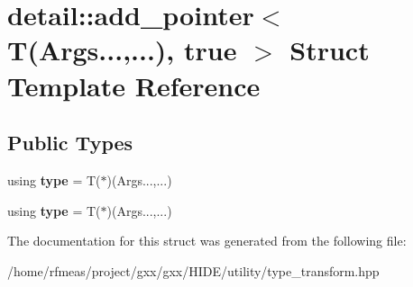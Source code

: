 \hypertarget{structdetail_1_1add__pointer_3_01T_07Args_8_8_8_00_8_8_8_08_00_01true_01_4}{}\section{detail\+:\+:add\+\_\+pointer$<$ T(Args...,...), true $>$ Struct Template Reference}
\label{structdetail_1_1add__pointer_3_01T_07Args_8_8_8_00_8_8_8_08_00_01true_01_4}
\subsection*{Public Types}
\begin{DoxyCompactItemize}
\item 
using {\bfseries type} = T($\ast$)(Args...,...)\hypertarget{structdetail_1_1add__pointer_3_01T_07Args_8_8_8_00_8_8_8_08_00_01true_01_4_a11c2462d35d30168f790a99cbe1d0abf}{}\label{structdetail_1_1add__pointer_3_01T_07Args_8_8_8_00_8_8_8_08_00_01true_01_4_a11c2462d35d30168f790a99cbe1d0abf}

\item 
using {\bfseries type} = T($\ast$)(Args...,...)\hypertarget{structdetail_1_1add__pointer_3_01T_07Args_8_8_8_00_8_8_8_08_00_01true_01_4_a11c2462d35d30168f790a99cbe1d0abf}{}\label{structdetail_1_1add__pointer_3_01T_07Args_8_8_8_00_8_8_8_08_00_01true_01_4_a11c2462d35d30168f790a99cbe1d0abf}

\end{DoxyCompactItemize}


The documentation for this struct was generated from the following file\+:\begin{DoxyCompactItemize}
\item 
/home/rfmeas/project/gxx/gxx/\+H\+I\+D\+E/utility/type\+\_\+transform.\+hpp\end{DoxyCompactItemize}
